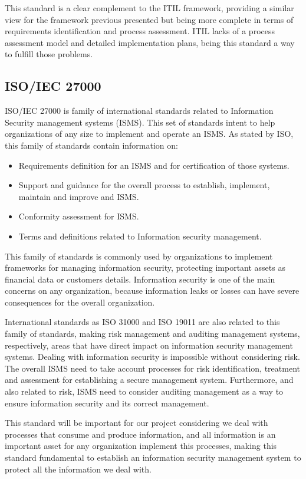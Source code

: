 \begin{itemize}
  \vspace{5mm}

  This standard is a clear complement to the ITIL framework, providing a similar view for the framework previous presented but being more complete in terms of requirements identification and process assessment. ITIL lacks of a process assessment model and detailed implementation plans, being this standard a way to fulfill those problems.\par
  
\end{itemize}

\subsection{ISO/IEC 27000}

ISO/IEC 27000\cite{ISO27000} is family of international standards related to Information Security management systems (ISMS). This set of standards intent to help organizations of any size to implement and operate an ISMS. As stated by ISO, this family of standards contain information on:

\begin{itemize}

\item Requirements definition for an ISMS and for certification of those systems.
\item Support and guidance for the overall process to establish, implement, maintain and improve and ISMS.
\item Conformity assessment for ISMS.
\item Terms and definitions related to Information security management.

\end{itemize}

This family of standards is commonly used by organizations to implement frameworks for managing information security, protecting important assets as financial data or customers details. Information security is one of the main concerns on any organization, because information leaks or losses can have severe consequences for the overall organization.\par
International standards as ISO 31000 and ISO 19011 are also related to this family of standards, making risk management and auditing management systems, respectively, areas that have direct impact on information security management systems. Dealing with information security is impossible without considering risk. The overall ISMS need to take account processes for risk identification, treatment and assessment for establishing a secure management system. Furthermore, and also related to risk, ISMS need to consider auditing management as a way to ensure information security and its correct management.\par
This standard will be important for our project considering we deal with processes that consume and produce information, and all information is an important asset for any organization implement this processes, making this standard fundamental to establish an information security management system to protect all the information we deal with.\par



